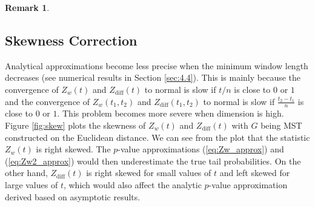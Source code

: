 \documentclass[arxiv, preprint]{imsart}
\numberwithin{equation}{section}
\theoremstyle{plain}
\newtheorem{remark}[thm]{Remark}
\begin{document}
\begin{remark}
%
%
\end{remark}

\subsection{Skewness Correction}

Analytical approximations become less precise when the minimum window length decreases (see numerical results in Section \ref{sec:4.4}). This is mainly because the convergence of $Z_w(t)$ and $Z_\text{diff}(t)$ to normal is slow if $t/n$ is close to $0$ or $1$ and the convergence of $Z_w(t_1,t_2)$ and $Z_\text{diff}(t_1,t_2)$ to normal is slow if $\frac{t_2 - t_1}{n}$ is close to $0$ or $1$. 
This problem becomes more severe when dimension is high. 
Figure \ref{fig:skew} plots the skewness of $Z_w(t)$ and $Z_\text{diff}(t)$ with $G$ being MST constructed on the Euclidean distance. We can see from the plot that the statistic $Z_w(t)$ is  right skewed. The $p$-value approximations (\ref{eq:Zw_approx}) and (\ref{eq:Zw2_approx}) would then underestimate the true tail probabilities. On the other hand, $Z_\text{diff}(t)$ is right skewed for small values of $t$ and left skewed for large values of $t$, which would also affect the analytic $p$-value approximation derived based on asymptotic results.
\end{document}
